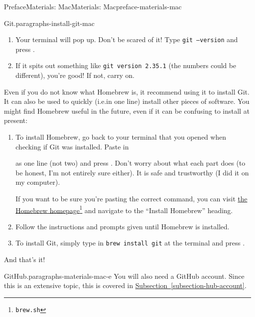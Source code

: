 \documentclass[oneside,10pt,]{book}
\newcommand{\xreffont}{\relax}
\newcommand{\mono}[1]{\texttt{#1}}
\newcommand{\kbd}[1]{\keys{{#1}}}
\begin{document}
\begin{preface}{Preface}{Materials: Mac}{}{Materials: Mac}{}{}{preface-materials-mac}
\begin{paragraphs}{Git.}{paragraphs-install-git-mac}
\begin{enumerate}
\item{}Your terminal will pop up. Don't be scared of it! Type \mono{git --version} and press \kbd{Enter}.%
\item{}If it spits out something like \mono{git version 2.35.1} (the numbers could be different), you're good! If not, carry on.%
\end{enumerate}
%
\par
Even if you do not know what Homebrew is, it recommend using it to install Git. It can also be used to quickly (i.e.\@ in one line) install other pieces of software. You might find Homebrew useful in the future, even if it can be confusing to install at present:%
\begin{enumerate}
\item{}To install Homebrew, go back to your terminal that you opened when checking if Git was installed. Paste in%
as one line (not two) and press \kbd{Enter}. Don't worry about what each part does (to be honest, I'm not entirely sure either). It is safe and trustworthy (I did it on my computer).%
\par
If you want to be sure you're pasting the correct command, you can visit \href{https://brew.sh/}{the Homebrew homepage}\footnote{\nolinkurl{brew.sh}\label{fn-install-git-mac-c-b-a-b-b}} and navigate to the ``Install Homebrew'' heading.%
\item{}Follow the instructions and prompts given until Homebrew is installed.%
\item{}To install Git, simply type in \mono{brew install git} at the terminal and press \kbd{Enter}.%
\end{enumerate}
And that's it!%
\end{paragraphs}%
\begin{paragraphs}{GitHub.}{paragraphs-materials-mac-e}%
You will also need a GitHub account. Since this is an extensive topic, this is covered in \hyperref[subsection-hub-account]{Subsection~{\xreffont\ref{subsection-hub-account}}}.%
\end{paragraphs}%
\end{preface}
%
%
\typeout{************************************************}
\typeout{************************************************}
%
\end{document}
